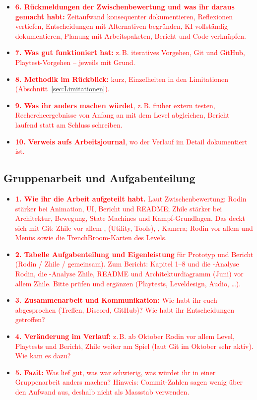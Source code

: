 \documentclass[../Main.tex]{subfiles}
\begin{document}
\begin{itemize}[leftmargin=1.5cm]
    \item \textcolor{red}{\textbf{6. Rückmeldungen der Zwischenbewertung und was ihr daraus gemacht habt:} Zeitaufwand konsequenter dokumentieren, Reflexionen vertiefen, Entscheidungen mit Alternativen begründen, KI vollständig dokumentieren, Planung mit Arbeitspaketen, Bericht und Code verknüpfen.}
    \item \textcolor{red}{\textbf{7. Was gut funktioniert hat:} z.\,B. iteratives Vorgehen, Git und GitHub, Playtest-Vorgehen -- jeweils mit Grund.}
    \item \textcolor{red}{\textbf{8. Methodik im Rückblick:} kurz, Einzelheiten in den Limitationen (Abschnitt~\ref{sec:Limitationen}).}
    \item \textcolor{red}{\textbf{9. Was ihr anders machen würdet}, z.\,B. früher extern testen, Rechercheergebnisse von Anfang an mit dem Level abgleichen, Bericht laufend statt am Schluss schreiben.}
    \item \textcolor{red}{\textbf{10. Verweis aufs Arbeitsjournal}, wo der Verlauf im Detail dokumentiert ist.}
\end{itemize}

\subsection{Gruppenarbeit und Aufgabenteilung}

\begin{itemize}[leftmargin=1.5cm]
    \item \textcolor{red}{\textbf{1. Wie ihr die Arbeit aufgeteilt habt.} Laut Zwischenbewertung: Rodin stärker bei Animation, UI, Bericht und README; Zhile stärker bei Architektur, Bewegung, State Machines und Kampf-Grundlagen. Das deckt sich mit Git: Zhile vor allem ,  (Utility, Tools), , Kamera; Rodin vor allem  und Menüs sowie die TrenchBroom-Karten des Levels.}
    \item \textcolor{red}{\textbf{2. Tabelle Aufgabenteilung und Eigenleistung} für Prototyp und Bericht (Rodin / Zhile / gemeinsam). Zum Bericht: Kapitel 1--8 und die -Analyse Rodin, die -Analyse Zhile, README und Architekturdiagramm (Juni) vor allem Zhile. Bitte prüfen und ergänzen (Playtests, Leveldesign, Audio, \ldots).}
    \item \textcolor{red}{\textbf{3. Zusammenarbeit und Kommunikation:} Wie habt ihr euch abgesprochen (Treffen, Discord, GitHub)? Wie habt ihr Entscheidungen getroffen?}
    \item \textcolor{red}{\textbf{4. Veränderung im Verlauf:} z.\,B. ab Oktober Rodin vor allem Level, Playtests und Bericht, Zhile weiter am Spiel (laut Git im Oktober sehr aktiv). Wie kam es dazu?}
    \item \textcolor{red}{\textbf{5. Fazit:} Was lief gut, was war schwierig, was würdet ihr in einer Gruppenarbeit anders machen? Hinweis: Commit-Zahlen sagen wenig über den Aufwand aus, deshalb nicht als Massstab verwenden.}
\end{itemize}
\end{document}
